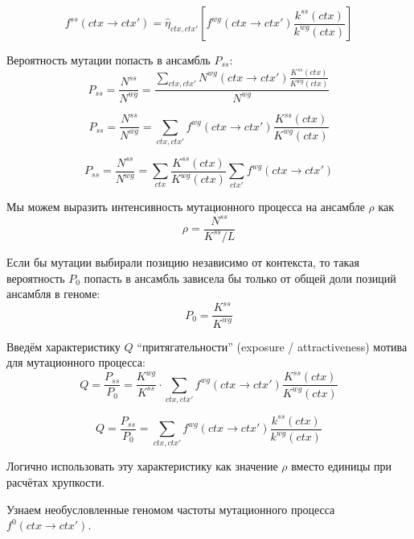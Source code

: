 \documentclass[a4paper]{article}
\begin{document}
\begin{equation}
	f^{ss}(ctx \to ctx') = \widehat{\eta}_{ctx,ctx'}\left[ f^{wg}(ctx \to ctx') \frac{k^{ss}(ctx)}{k^{wg}(ctx)} \right]
\end{equation}


Вероятность мутации попасть в ансамбль $P_{ss}$:
\begin{equation}
	P_{ss} = \frac{N^{ss}}{N^{wg}} = \frac{ \sum_{ctx, ctx'} N^{wg}(ctx \to ctx') \frac{K^{ss}(ctx)}{K^{wg}(ctx)} }{N^{wg}}
\end{equation}

\begin{equation}
	P_{ss} = \frac{N^{ss}}{N^{wg}} = \sum_{ctx, ctx'} f^{wg}(ctx \to ctx') \frac{K^{ss}(ctx)}{K^{wg}(ctx)}
\end{equation}

\begin{equation}
	P_{ss} = \frac{N^{ss}}{N^{wg}} = \sum_{ctx} \frac{K^{ss}(ctx)}{K^{wg}(ctx)}\sum_{ctx'}f^{wg}(ctx \to ctx')
\end{equation}

Мы можем выразить интенсивность мутационного процесса на ансамбле $\rho$ как
\begin{equation}
	\rho = \frac{N^{ss}}{K^{ss} / L}
\end{equation}


Если бы мутации выбирали позицию независимо от контекста, то такая вероятность $P_0$ попасть в ансамбль зависела бы только от общей доли позиций ансамбля в геноме:
\begin{equation}
	P_0 = \frac{K^{ss}}{K^{wg}}
\end{equation}

Введём характеристику $Q$ ``притягательности'' (exposure / attractiveness) мотива для мутационного процесса:
\begin{equation}
	Q = \frac{P_{ss}}{P_0} = \frac{K^{wg}}{K^{ss}}\cdot \sum_{ctx, ctx'} f^{wg}(ctx \to ctx') \frac{K^{ss}(ctx)}{K^{wg}(ctx)}
\end{equation}

\begin{equation}
	Q = \frac{P_{ss}}{P_0} = \sum_{ctx, ctx'} f^{wg}(ctx \to ctx') \frac{k^{ss}(ctx)}{k^{wg}(ctx)}
\end{equation}


Логично использовать эту характеристику как значение $\rho$ вместо единицы при расчётах хрупкости.


Узнаем необусловленные геномом частоты мутационного процесса $f^0(ctx \to ctx')$.
\end{document}
